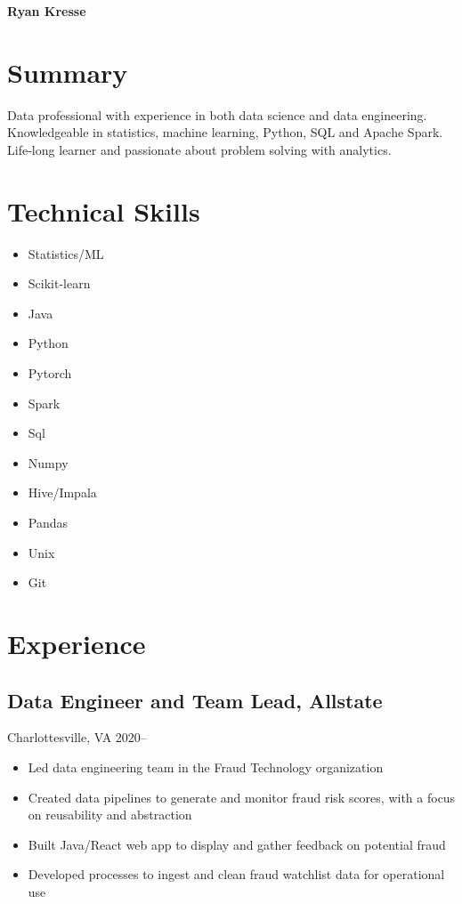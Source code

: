 \documentclass[11pt]{article}
\begin{document}
	\noindent \textbf{{\fontsize{38pt}{\parskip}\selectfont \color{RyanRed} Ryan Kresse}}
	\smallskip


	\section{Summary}
	Data professional with experience in both data science and data engineering. Knowledgeable in statistics, machine learning, Python, SQL and Apache Spark. Life-long learner and passionate about problem solving with analytics.
	\section{Technical Skills}
		\begin{multicols}{4}
				\begin{itemize}
				\item Statistics/ML
				\item Scikit-learn
				\item Java

				\columnbreak
				\item Python
				\item Pytorch
				\item Spark

				\columnbreak
				\item Sql
				\item Numpy
				\item Hive/Impala

				\columnbreak
				\item Pandas
				\item Unix
				\item Git
				\columnbreak

			\end{itemize}
		\end{multicols}



	\section{Experience}

	\subsection{\normalsize{Data Engineer and Team Lead, Allstate}}
	{\fontsize{10pt}{\parskip}\selectfont Charlottesville, VA 2020--}
	\begin{itemize}
	\item Led data engineering team in the Fraud Technology organization
	\item Created data pipelines to generate and monitor fraud risk scores, with a focus on reusability and abstraction
	\item Built Java/React web app to display and gather feedback on potential fraud
	\item Developed processes to ingest and clean fraud watchlist data for operational use
	\end{itemize}
\end{document}
